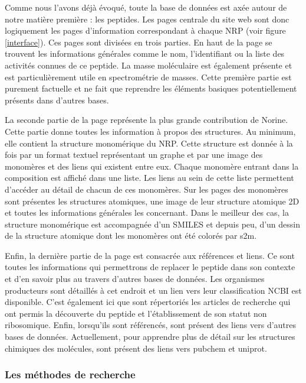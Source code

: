 Comme nous l'avons déjà évoqué, toute la base de données est axée autour de notre matière première : les peptides.
Les pages centrale du site web sont donc logiquement les pages d'information correspondant à chaque NRP (voir figure \ref{interface}).
Ces pages sont divisées en trois parties.
En haut de la page se trouvent les informations générales comme le nom, l'identifiant ou la liste des activités connues de ce peptide.
La masse moléculaire est également présente et est particulièrement utile en spectrométrie de masses.
Cette première partie est purement factuelle et ne fait que reprendre les éléments basiques potentiellement présents dans d'autres bases.

La seconde partie de la page représente la plus grande contribution de Norine.
Cette partie donne toutes les information à propos des structures.
Au minimum, elle contient la structure monomérique du NRP.
Cette structure est donnée à la fois par un format textuel représentant un graphe et par une image des monomères et des liens qui existent entre eux.
Chaque monomère entrant dans la composition est affiché dans une liste.
Les liens au sein de cette liste permettent d'accéder au détail de chacun de ces monomères.
Sur les pages des monomères sont présentes les structures atomiques, une image de leur structure atomique 2D et toutes les informations générales les concernant.
Dans le meilleur des cas, la structure monomérique est accompagnée d'un SMILES et depuis peu, d'un dessin de la structure atomique dont les monomères ont été colorés par s2m.

Enfin, la dernière partie de la page est consacrée aux références et liens.
Ce sont toutes les informations qui permettrons de replacer le peptide dans son contexte et d'en savoir plus au travers d'autres bases de données.
Les organismes producteurs sont détaillés à cet endroit et un lien vers leur classification NCBI est disponible.
C'est également ici que sont répertoriés les articles de recherche qui ont permis la découverte du peptide et l'établissement de son statut non ribosomique.
Enfin, lorsqu'ils sont référencés, sont présent des liens vers d'autres bases de données.
Actuellement, pour apprendre plus de détail sur les structures chimiques des molécules, sont présent des liens vers pubchem et uniprot.


\subsubsection{Les méthodes de recherche}

